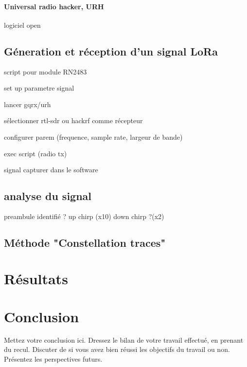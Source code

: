 \documentclass[12pt,a4paper,oneside, titlepage]{report}
\begin{document}
\subsubsection{Universal radio hacker, URH}

logiciel open

\section{Géneration et réception d'un signal LoRa}

script pour module RN2483

set up parametre signal

lancer gqrx/urh

sélectionner rtl-sdr ou hackrf comme récepteur

configurer parem (frequence, sample rate, largeur de bande)

exec script (radio tx)

signal capturer dans le software

\section{analyse du signal}

preambule identifié ? up chirp (x10) down chirp ?(x2)

\section{Méthode "Constellation traces"}

\chapter{Résultats}





\chapter*{Conclusion}
\renewcommand{\leftmark}{CONCLUSION}

Mettez votre conclusion ici.  Dressez le bilan de votre travail effectué, en prenant du recul. Discuter de si vous avez bien réussi les objectifs du travail ou non. Présentez les perspectives futurs.





\end{document}
